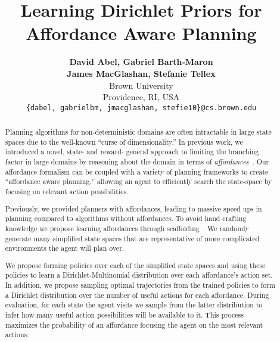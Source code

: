\documentclass[]{article}
\title{\textbf{Learning Dirichlet Priors for \\Affordance Aware Planning}}
\begin{document}
\author{
\textbf{David Abel, Gabriel Barth-Maron} \\ \textbf{James MacGlashan, Stefanie Tellex} \\
Brown University \\
Providence, RI, USA \\
\texttt{\{dabel, gabrielbm, jmacglashan, stefie10\}@cs.brown.edu}}

\date{}
\maketitle

\begin{abstract}
Planning algorithms for non-deterministic domains are often
intractable in large state spaces due to the well-known ``curse of
dimensionality.'' In previous work, we introduced a novel, state- and reward- general approach to limiting the
branching factor in large domains by reasoning about the
domain in terms of {\em affordances}~\citep{gibson77}.  Our affordance
formalism can be coupled with a variety of planning frameworks to
create ``affordance aware planning,'' allowing an agent to efficiently
search the state-space by focusing on relevant action possibilities. 



  
Previously, we provided planners with affordances, leading to massive
speed ups in planning compared to algorithms without affordances. 
To avoid hand crafting knowledge we propose learning affordances through scaffolding~\citep{bruner76}. We randomly generate many simplified state spaces that are
representative of more complicated environments the agent will plan over.

We propose forming policies over each of the simplified state spaces and using these policies to learn a
Dirichlet-Multinomial distribution over each affordance's action set. In addition, we propose sampling optimal trajectories from the trained policies to form a Dirichlet distribution over the number of useful actions for each affordance. During evaluation, for each state the agent visits we sample from the latter distribution to infer how many useful action possibilities will be available to it. This process maximizes the probability of an affordance focusing the agent on the most relevant actions.


\end{abstract}
\end{document}
